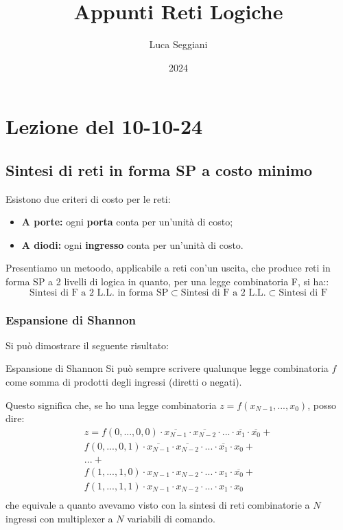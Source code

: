 \documentclass[a4paper,11pt]{article}
\title{Appunti Reti Logiche}
\author{Luca Seggiani}
\date{2024}
\begin{document}
\section{Lezione del 10-10-24}

\thispagestyle{empty}
\pagestyle{fancy}

\subsection{Sintesi di reti in forma SP a costo minimo}
Esistono due criteri di costo per le reti:
\begin{itemize}
	\item \textbf{A porte:} ogni \textbf{porta} conta per un'unità di costo;
	\item \textbf{A diodi:} ogni \textbf{ingresso} conta per un'unità di costo.
\end{itemize}

Presentiamo un metoodo, applicabile a reti con'un uscita, che produce reti in forma SP a 2 livelli di logica in quanto, per una legge combinatoria F, si ha::
$$
\text{Sintesi di F a 2 L.L. in forma SP} \subset \text{Sintesi di F a 2 L.L.} \subset \text{Sintesi di F}
$$

\subsubsection{Espansione di Shannon}
Si può dimostrare il seguente risultato:
\begin{theorem}{Espansione di Shannon}
	Si può sempre scrivere qualunque legge combinatoria $f$ come somma di prodotti degli ingressi (diretti o negati).
\end{theorem}

Questo significa che, se ho una legge combinatoria $z = f(x_{N-1}, ..., x_0)$, posso dire:
\[
	\begin{aligned}
		z = f(0, ..., 0,  0) \cdot \overline{x_{N-1}} \cdot \overline{x_{N-2}} \cdot ... \cdot \overline{x_1} \cdot \overline{x_0}	+ \\
		f(0, ..., 0, 1) \cdot \overline{x_{N-1}} \cdot \overline{x_{N-2}} \cdot ... \cdot \overline{x_1} \cdot x_0	+\\
		... + \\
		f(1, ..., 1, 0) \cdot x_{N-1} \cdot x_{N-2} \cdot ... \cdot x_1 \cdot \overline{x_0}	+\\
		f(1, ..., 1, 1) \cdot x_{N-1} \cdot x_{N-2} \cdot ... \cdot x_1 \cdot x_0	\\
	\end{aligned}
\]
che equivale a quanto avevamo visto con la sintesi di reti combinatorie a $N$ ingressi con multiplexer a $N$ variabili di comando.
\end{document}
